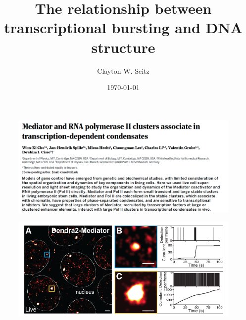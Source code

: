 \documentclass[aspectratio=1610]{beamer}					%
\title{The relationship between transcriptional bursting and DNA structure}	%
\author{Clayton W. Seitz}								%
\date{\today}									%
\begin{document}
\begin{frame}
  \titlepage
\end{frame}


%

\begin{frame}{}
\begin{figure}
\includegraphics[width=14cm]{abstract-1.png}
\end{figure}
\end{frame}


\begin{frame}{}
\begin{figure}
\includegraphics[width=14cm]{figure-1-1.png}
\end{figure}
\end{frame}
\end{document}
